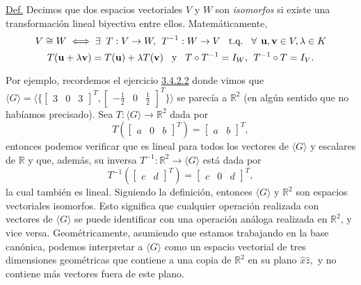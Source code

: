 \documentclass[12pt]{article}
\begin{document}
\vspace{3mm}
\begin{tcolorbox}
    \underline{Def.} Decimos que dos espacios vectoriales $V$ y $W$ son \emph{isomorfos} si existe una transformación lineal biyectiva entre ellos. Matemáticamente, \[
    V\cong W \iff \exists\hspace{2mm} T:V\to W, \hspace{1.5mm} T^{-1}:W\to V \hspace{3mm} \text{t.q.} \hspace{3mm} \forall\hspace{1.5mm} \mathbf{u},\mathbf{v}\in V, \lambda\in K\] \[ T(\mathbf{u}+\lambda\mathbf{v})=T(\mathbf{u})+\lambda T(\mathbf{v}) \hspace{3mm} \text{y} \hspace{3mm} T\circ T^{-1} = I_W, \hspace{1.5mm} T^{-1}\circ T = I_V
    .\] 
\end{tcolorbox}

\vspace{3mm}
Por ejemplo, recordemos el ejercicio \hyperlink{Ejer:3.4.2.2}{3.4.2.2} donde vimos que $\langle G \rangle = \langle \{\begin{bmatrix} 3&0&3 \end{bmatrix}^T, \begin{bmatrix} -\frac{1}{2}&0&\frac{1}{2} \end{bmatrix}^T \} \rangle$ se parecía a $\mathbb{R}^2$ (en algún sentido que no habíamos precisado). Sea $T: \langle G \rangle \to \mathbb{R}^2$ dada por $$T(\begin{bmatrix} a&0&b \end{bmatrix}^T)=\begin{bmatrix} a&b \end{bmatrix}^T,$$ \noindent entonces podemos verificar que es lineal para todos los vectores de $\langle G \rangle$ y escalares de $\mathbb{R}$ y que, además, su inversa $T^{-1}:\mathbb{R}^2\to \langle G \rangle$ está dada por $$T^{-1}(\begin{bmatrix} c&d\end{bmatrix}^T) = \begin{bmatrix} c&0&d \end{bmatrix}^T,$$ \noindent la cual también es lineal. Siguiendo la definición, entonces $\langle G \rangle$ y $\mathbb{R}^2$ son espacios vectoriales isomorfos. Esto significa que cualquier operación realizada con vectores de $\langle G \rangle$ se puede identificar con una operación análoga realizada en $\mathbb{R}^2$, y vice versa. Geométricamente, asumiendo que estamos trabajando en la base canónica, podemos interpretar a $\langle G \rangle$ como un espacio vectorial de tres dimensiones geométricas que contiene a una copia de $\mathbb{R}^2$ en su plano $\hat{x}\hat{z},$ y no contiene más vectores fuera de este plano.
\end{document}
